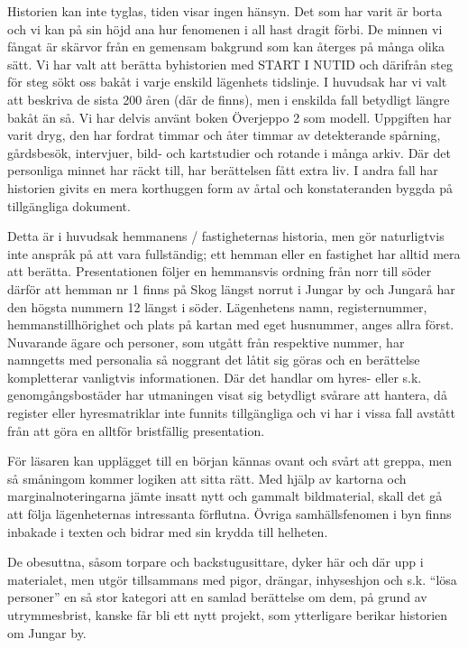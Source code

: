
%

Historien kan inte tyglas, tiden visar ingen hänsyn. Det som har varit är borta och vi kan på sin höjd ana hur fenomenen i all hast dragit förbi. De minnen vi fångat är skärvor från en gemensam bakgrund som kan återges på många olika sätt. Vi har valt att berätta byhistorien med START I NUTID och därifrån steg för steg sökt oss bakåt i varje enskild lägenhets tidslinje. I huvudsak har vi valt att beskriva de sista 200 åren (där de finns), men i enskilda fall betydligt längre bakåt än så. Vi har delvis använt boken Överjeppo 2 som modell. Uppgiften har varit dryg, den har fordrat timmar och åter timmar av detekterande spårning, gårdsbesök, intervjuer, bild- och kartstudier och rotande i många arkiv. Där det personliga minnet har räckt till, har berättelsen fått extra liv. I andra fall har historien givits en mera korthuggen form av årtal och konstateranden byggda på tillgängliga dokument.

Detta är i huvudsak hemmanens / fastigheternas historia, men gör naturligtvis inte anspråk på att vara fullständig; ett hemman eller en fastighet har alltid mera att berätta. Presentationen följer en hemmansvis ordning från norr till söder därför  att hemman nr 1 finns på Skog längst norrut i Jungar by och Jungarå har den högsta nummern 12 längst i söder. Lägenhetens namn, registernummer, hemmanstillhörighet och plats på kartan med eget husnummer, anges allra först. Nuvarande ägare och personer, som utgått från respektive nummer, har namngetts med personalia så noggrant det låtit sig göras och en berättelse kompletterar vanligtvis informationen. Där det handlar om hyres- eller s.k. genomgångsbostäder har utmaningen visat sig betydligt svårare att hantera, då register eller hyresmatriklar  inte funnits tillgängliga och vi har i vissa fall avstått från att göra en alltför bristfällig presentation.

För läsaren kan upplägget till en början kännas ovant och svårt att greppa, men så småningom kommer logiken att sitta rätt. Med hjälp av kartorna och marginalnoteringarna jämte insatt nytt och gammalt bildmaterial, skall det gå att följa lägenheternas intressanta förflutna. Övriga samhällsfenomen i byn finns inbakade i texten och bidrar med sin krydda till helheten.

De obesuttna, såsom torpare och backstugusittare, dyker här och där upp i materialet, men utgör tillsammans med pigor, drängar, inhyseshjon och s.k. ``lösa personer'' en så stor kategori att en samlad berättelse om dem, på grund av utrymmesbrist,  kanske får bli ett nytt projekt, som ytterligare berikar historien om Jungar by.

